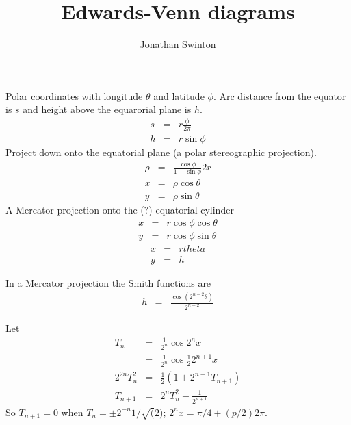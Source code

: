 \documentclass[a4paper]{article}
\title{
Edwards-Venn diagrams
}
\author{Jonathan Swinton}
\begin{document}
\maketitle


Polar coordinates with longitude $\theta$ and latitude $\phi$. Arc distance
from the equator is $s$ and height above the equarorial plane is $h$.
\begin{eqnarray*}
s &=& r \frac{\phi}{2\pi}
\\
h &=& r \sin \phi
\end{eqnarray*}
Project down onto the equatorial plane (a polar stereographic projection).
\begin{eqnarray*}
\rho &=& \frac{\cos\phi}{1-\sin\phi} 2r
\\
x &=& \rho \cos \theta
\\
y &=& \rho \sin \theta
\end{eqnarray*}
A Mercator projection onto the (?) equatorial cylinder
\begin{eqnarray*}
x &=& r \cos \phi \cos \theta
\\
y &=& r \cos \phi \sin \theta
\end{eqnarray*}
\begin{eqnarray*}
x &=&  r theta
\\
y &=& h
\end{eqnarray*}

In a Mercator projection the Smith functions are
\begin{eqnarray*}
h &=& \frac{ \cos(2^{n-2} \theta)}{2^{n-2}}
\end{eqnarray*}

Let 
\begin{eqnarray*}
T_n &=& \frac{1}{2^n}\cos{2^n x}
\\
&=&  \frac{1}{2^n}\cos\frac{1}{2}{2^{n+1} x}
\\
2^{2n} T_n^2 &=& \frac{1}{2}\left( 1+ 2^{n+1}T_{n+1}\right)
\\
T_{n+1} &=& 2^{n} T_n^2 - \frac{1}{2^{n+1}}
\end{eqnarray*}
So $T_{n+1}=0$ when $T_n=\pm 2^{-n} 1/\sqrt(2)$; $2^nx=\pi/4+(p/2)2\pi$.
\end{document}

